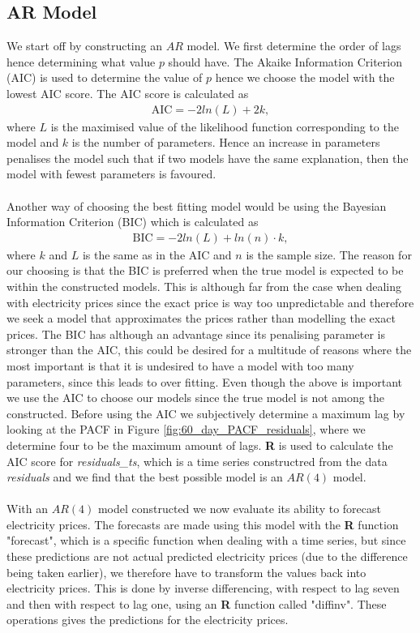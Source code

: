 \subsection{AR Model}\label{subs:AR-model}
We start off by constructing an $AR$ model. We first determine the order of lags hence determining what value $p$ should have. The Akaike Information Criterion (AIC) is used to determine the value of $p$ hence we choose the model with the lowest AIC score. The AIC score is calculated as
\begin{align*}
    \text{AIC}=-2ln(L)+2k,
\end{align*}
where $L$ is the maximised value of the likelihood function corresponding to the model and $k$ is the number of parameters. Hence an increase in parameters penalises the model such that if two models have the same explanation, then the model with fewest parameters is favoured.\\\\
\noindent Another way of choosing the best fitting model would be using the Bayesian Information Criterion (BIC) which is calculated as 
\begin{align*}
    \text{BIC}=-2ln(L)+ln(n)\cdot k,
\end{align*}
where $k$ and $L$ is the same as in the AIC and $n$ is the sample size. The reason for our choosing is that the BIC is preferred when the true model is expected to be within the constructed models. This is although far from the case when dealing with electricity prices since the exact price is way too unpredictable and therefore we seek a model that approximates the prices rather than modelling the exact prices. The BIC has although an advantage since its penalising parameter is stronger than the AIC, this could be desired for a multitude of reasons where the most important is that it is undesired to have a model with too many parameters, since this leads to over fitting. 
Even though the above is important we use the AIC to choose our models since the true model is not among the constructed.
Before using the AIC we subjectively determine a maximum lag by looking at the PACF in Figure \ref{fig:60_day_PACF_residuals}, where we determine four to be the maximum amount of lags. \textbf{R} is used to calculate the AIC score for \textit{residuals\_ts}, which is a time series constructred from the data \textit{residuals} and we find that the best possible model is an $AR(4)$ model. \\\\
\noindent With an $AR(4)$ model constructed we now evaluate its ability to forecast electricity prices. The forecasts are made using this model with the \textbf{R} function "forecast", which is a specific function when dealing with a time series, but since these predictions are not actual predicted electricity prices (due to the difference being taken earlier), we therefore have to transform the values back into electricity prices. This is done by inverse differencing, with respect to lag seven and then with respect to lag one, using an \textbf{R} function called "diffinv". These operations gives the predictions for the electricity prices.
